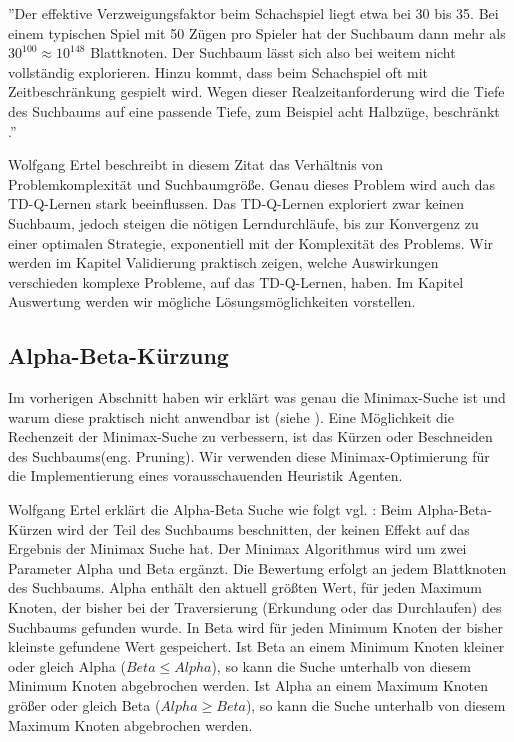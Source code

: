 ''Der effektive Verzweigungsfaktor beim Schachspiel liegt etwa bei 30 bis 35. Bei einem typischen Spiel mit 50 Zügen pro Spieler hat der Suchbaum dann mehr als $30^{100} \approx 10^{148}$ Blattknoten. Der Suchbaum lässt sich also bei weitem nicht vollständig explorieren. Hinzu kommt, dass beim Schachspiel oft mit Zeitbeschränkung gespielt wird. Wegen dieser Realzeitanforderung wird die Tiefe des Suchbaums auf eine passende Tiefe, zum Beispiel acht Halbzüge, beschränkt \cite[114 \psq]{Ertel}.''

Wolfgang Ertel beschreibt in diesem Zitat das Verhältnis von Problemkomplexität und Suchbaumgröße. Genau dieses Problem wird auch das TD-Q-Lernen stark beeinflussen. Das TD-Q-Lernen exploriert zwar keinen Suchbaum, jedoch steigen die nötigen Lerndurchläufe, bis zur Konvergenz zu einer optimalen Strategie, exponentiell mit der Komplexität des Problems. Wir werden im Kapitel Validierung praktisch zeigen, welche Auswirkungen verschieden komplexe Probleme, auf das TD-Q-Lernen, haben. Im Kapitel Auswertung werden wir mögliche Lösungsmöglichkeiten vorstellen.

\subsection{Alpha-Beta-Kürzung}
\label{subsec:Alpha-Beta-Kürzung}
Im vorherigen Abschnitt haben wir erklärt was genau die Minimax-Suche ist und warum diese praktisch nicht anwendbar ist (siehe \cite[114 \psq]{Ertel}). Eine Möglichkeit die Rechenzeit der Minimax-Suche zu verbessern, ist das Kürzen oder Beschneiden des Suchbaums(eng. Pruning). Wir verwenden diese Minimax-Optimierung für die Implementierung eines vorausschauenden Heuristik Agenten.

Wolfgang Ertel erklärt die Alpha-Beta Suche wie folgt vgl. \cite[116]{Ertel}:
Beim Alpha-Beta-Kürzen wird der Teil des Suchbaums beschnitten, der keinen Effekt auf das Ergebnis der Minimax Suche hat. Der Minimax Algorithmus wird um zwei Parameter Alpha und Beta ergänzt. Die Bewertung erfolgt an jedem Blattknoten des Suchbaums. Alpha enthält den aktuell größten Wert, für jeden Maximum Knoten, der bisher bei der Traversierung (Erkundung oder das Durchlaufen) des Suchbaums gefunden wurde. In Beta wird für jeden Minimum Knoten der bisher kleinste gefundene Wert gespeichert. Ist Beta an einem Minimum Knoten kleiner oder gleich Alpha ($Beta \leq Alpha$), so kann die Suche unterhalb von diesem Minimum Knoten abgebrochen werden. Ist Alpha an einem Maximum Knoten größer oder gleich Beta ($Alpha \geq Beta$), so kann die Suche unterhalb von diesem Maximum Knoten abgebrochen werden. \\

